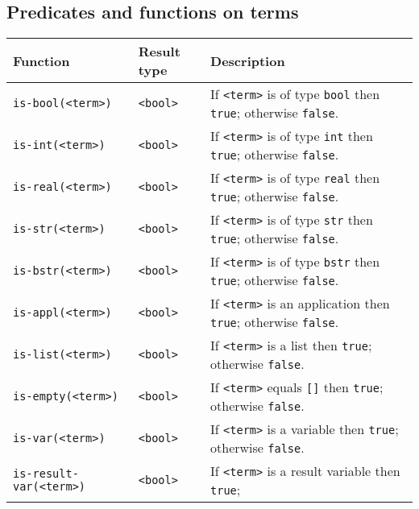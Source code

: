 \documentclass[twoside]{article} %
\begin{document}
\subsection{Predicates and functions on terms}
\begin{tabular}{|l|l|p{8cm}|} \hline
 Function                               & Result type   & Description \\ \hline
 {\tt is-bool(<term>)}                  & {\tt  <bool>} & If {\tt <term>} is of type {\tt bool} then {\tt true};
                                                          otherwise {\tt false}.\\
 {\tt is-int(<term>)}                   & {\tt  <bool>} & If {\tt <term>} is of type {\tt int} then {\tt true};
                                                          otherwise {\tt false}.\\
 {\tt is-real(<term>)}                  & {\tt  <bool>} & If {\tt <term>} is of type {\tt real} then {\tt true};
                                                          otherwise {\tt false}.\\
 {\tt is-str(<term>)}                   & {\tt  <bool>} & If {\tt <term>} is of type {\tt str} then {\tt true};
                                                          otherwise {\tt false}.\\
 {\tt is-bstr(<term>)}                  & {\tt  <bool>} & If {\tt <term>} is of type {\tt bstr} then {\tt true};
                                                          otherwise {\tt false}.\\
 {\tt is-appl(<term>)}                  & {\tt  <bool>} & If {\tt <term>} is an application then {\tt true};
                                                          otherwise {\tt false}.\\
 {\tt is-list(<term>)}                  & {\tt  <bool>} & If {\tt <term>} is a list then {\tt true};
                                                          otherwise {\tt false}.\\
 {\tt is-empty(<term>)}                 & {\tt  <bool>} & If {\tt <term>} equals {\tt []} then {\tt true};
                                                          otherwise {\tt false}.\\
 {\tt is-var(<term>)}                   & {\tt  <bool>} & If {\tt <term>} is a variable then {\tt true};
                                                          otherwise {\tt false}.\\
 {\tt is-result-var(<term>)}            & {\tt  <bool>} & If {\tt <term>} is a result variable then {\tt true};

\end{tabular}
\end{document}
